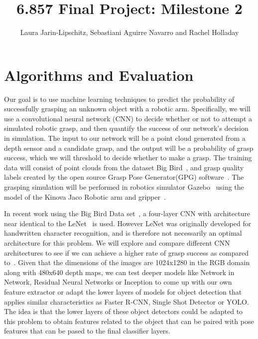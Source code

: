 \documentclass[letterpaper, 10 pt]{article}
\begin{document}
\title{6.857 Final Project: Milestone 2}
\author{Laura Jarin-Lipschitz, Sebastiani Aguirre Navarro and Rachel Holladay}
\maketitle

\section{Algorithms and Evaluation}

Our goal is to use machine learning techniques to predict the probability of successfully grasping an unknown object with a robotic arm. Specifically, we will use a convolutional neural network (CNN) to decide whether or not to attempt a simulated robotic grasp, and then quantify the success of our network's decision in simulation. The input to our network will be a point cloud generated from a depth sensor and a candidate grasp, and the output will be a probability of grasp success, which we will threshold to decide whether to make a grasp. The training data will consist of point clouds from the dataset Big Bird~\cite{singh2014bigbird}, and grasp quality labels created by the open source Grasp Pose Generator(GPG) software~\cite{pas2017grasp}. The grasping simulation will be performed in robotics simulator Gazebo~\cite{koenig2004design} using the model of the Kinova Jaco Robotic arm and gripper~\cite{maheu2011evaluation}.

In recent work using the Big Bird Data set~\cite{pas2017grasp}, a four-layer CNN with architecture near identical to the LeNet~\cite{lecun1998gradient} is used. However LeNet was originally developed for handwritten character recognition, and is therefore not necessarily an optimal architecture for this problem. We will explore and compare different CNN architectures to see if we can achieve a higher rate of grasp success as compared to~\cite{pas2017grasp}.
Given that the dimensions of the images are 1024x1280 in the RGB domain along with 480x640 depth maps, we can test deeper models like Network in Network, Residual Neural Networks or Inception to come up with our own feature extractor or adapt the lower layers of models for object detection that applies similar characteristics as Faster R-CNN, Single Shot Detector or YOLO. The idea is that the lower layers of these object detectors could be adapted to this problem to obtain features related to the object that can be paired with pose features that can be pased to the final classifier layers.
 
\end{document}
